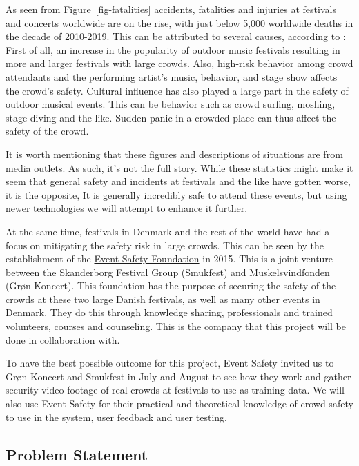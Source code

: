 \documentclass[
]{article}
\begin{document}
As seen from Figure~\ref{fig-fatalities} accidents, fatalities and
injuries at festivals and concerts worldwide are on the rise, with just
below 5,000 worldwide deaths in the decade of 2010-2019. This can be
attributed to several causes, according to \textcite{inproceedings}:
First of all, an increase in the popularity of outdoor music festivals
resulting in more and larger festivals with large crowds. Also,
high-risk behavior among crowd attendants and the performing artist's
music, behavior, and stage show affects the crowd's safety. Cultural
influence has also played a large part in the safety of outdoor musical
events. This can be behavior such as crowd surfing, moshing, stage
diving and the like. Sudden panic in a crowded place can thus affect the
safety of the crowd.

It is worth mentioning that these figures and descriptions of situations
are from media outlets. As such, it's not the full story. While these
statistics might make it seem that general safety and incidents at
festivals and the like have gotten worse, it is the opposite, It is
generally incredibly safe to attend these events, but using newer
technologies we will attempt to enhance it further.

At the same time, festivals in Denmark and the rest of the world have
had a focus on mitigating the safety risk in large crowds. This can be
seen by the establishment of the
\href{https://eventsafety.dk/historie}{Event Safety Foundation} in 2015.
This is a joint venture between the Skanderborg Festival Group
(Smukfest) and Muskelsvindfonden (Grøn Koncert). This foundation has the
purpose of securing the safety of the crowds at these two large Danish
festivals, as well as many other events in Denmark. They do this through
knowledge sharing, professionals and trained volunteers, courses and
counseling. This is the company that this project will be done in
collaboration with.

To have the best possible outcome for this project, Event Safety invited
us to Grøn Koncert and Smukfest in July and August to see how they work
and gather security video footage of real crowds at festivals to use as
training data. We will also use Event Safety for their practical and
theoretical knowledge of crowd safety to use in the system, user
feedback and user testing.

\hypertarget{problem-statement}{%
\subsection{Problem Statement}\label{problem-statement}}
\end{document}
